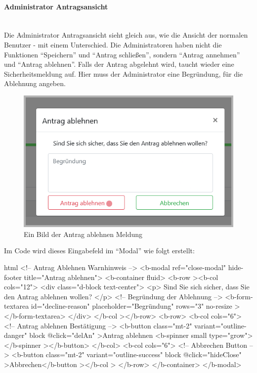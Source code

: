 \paragraph{Administrator Antragsansicht}
~\\
Die Administrator Antragsansicht sieht gleich aus, wie die Ansicht der normalen Benutzer - mit einem Unterschied. Die Administratoren haben nicht die Funktionen \enquote{Speichern} und \enquote{Antrag schließen}, sondern \enquote{Antrag annehmen} und \enquote{Antrag ablehnen}. Falls der Antrag abgelehnt wird, taucht wieder eine Sicherheitsmeldung auf. Hier muss der Administrator eine Begründung, für die Ablehnung angeben. 
\begin{figure}[H]
	\centering
	\includegraphics[width=0.6\linewidth]{images/ldehner_implementierung/admin_antrag_schiessen}
	\caption[Antrag ablehnen Warnung]{Ein Bild der Antrag ablehnen Meldung}
	\label{fig:adminclose}
\end{figure}
Im Code wird dieses Eingabefeld im \enquote{Modal} wie folgt erstellt:
\begin{code}{html}
	<!-- Antrag Ablehnen Warnhinweis -->
    <b-modal ref="close-modal" hide-footer title="Antrag ablehnen">
      <b-container fluid>
        <b-row
          ><b-col cols="12">
            <div class="d-block text-center">
              <p>
                Sind Sie sich sicher, dass Sie den Antrag ablehnen wollen?
              </p>
              <!-- Begründung der Ablehnung -->
              <b-form-textarea
                id="decline-reason"
                placeholder="Begründung"
                rows="3"
                no-resize
              ></b-form-textarea>
            </div> </b-col
        ></b-row>
        <b-row>
          <b-col cols="6">
            <!-- Antrag ablehnen Bestätigung -->
            <b-button class="mt-2" variant="outline-danger" block @click="delAn"
              >Antrag ablehnen <b-spinner small type="grow"></b-spinner
            ></b-button>
          </b-col>
          <b-col cols="6">
            <!-- Abbrechen Button -->
            <b-button
              class="mt-2"
              variant="outline-success"
              block
              @click="hideClose"
              >Abbrechen</b-button
            ></b-col
          >
        </b-row>
      </b-container>
    </b-modal>
\end{code}
	\label{list:badgebsp} ~\\
\newpage
